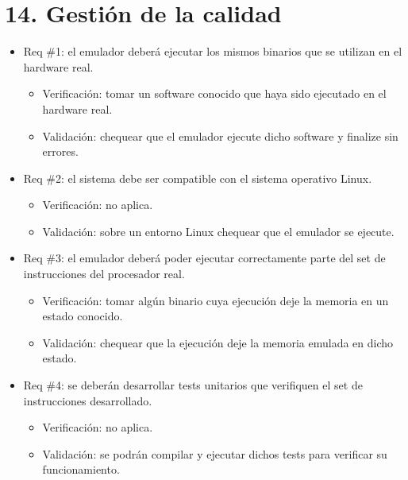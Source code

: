 
\section{14. Gestión de la calidad}
\label{sec:calidad}

\begin{itemize}

\item Req \#1: el emulador deberá ejecutar los mismos binarios que se utilizan en el hardware real.

  \begin{itemize}
  \item Verificación: tomar un software conocido que haya sido ejecutado en el hardware real.
  \item Validación: chequear que el emulador ejecute dicho software y finalize sin errores.
  \end{itemize}

\item Req \#2: el sistema debe ser compatible con el sistema operativo Linux.

  \begin{itemize}
  \item Verificación: no aplica.
  \item Validación: sobre un entorno Linux chequear que el emulador se ejecute.
  \end{itemize}

\item Req \#3: el emulador deberá poder ejecutar correctamente parte del set de instrucciones del procesador real.

  \begin{itemize}
  \item Verificación: tomar algún binario cuya ejecución deje la memoria en un estado conocido.
  \item Validación: chequear que la ejecución deje la memoria emulada en dicho estado.
  \end{itemize}

\item Req \#4: se deberán desarrollar tests unitarios que verifiquen el set de instrucciones desarrollado.

  \begin{itemize}
  \item Verificación: no aplica.
  \item Validación: se podrán compilar y ejecutar dichos tests para verificar su funcionamiento.
  \end{itemize}


\end{itemize}
